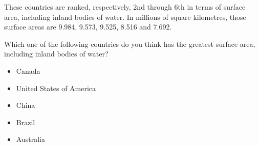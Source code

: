 These countries are ranked, respectively, 2nd through 6th in terms of surface area, including inland bodies of water.
In millions of square kilometres, those surface areas are 9.984, 9.573, 9.525, 8.516 and 7.692.

\begin{tcolorbox}
Which one of the following countries do you think has the greatest surface area, including inland bodies of water?

\begin{itemize}
	\item Canada
	\item United States of America
	\item China
	\item Brazil
	\item Australia
\end{itemize}
\end{tcolorbox}
